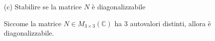 \documentclass[a4paper]{article}
\theoremstyle{break}
\theoremstyle{break}
\theoremstyle{break}
\theoremstyle{break}
\begin{document}
\begin{enumerate}
	\item[(c)] Stabilire se la matrice \( N \) è diagonalizzabile

	      \vspace{1em}
	      Siccome la matrice \( N \in M_{3 \times 3}(\mathbb{C}) \) ha 3 autovalori distinti, allora è diagonalizzabile.
\end{enumerate}
\end{document}
